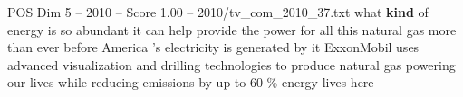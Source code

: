 \begin{textsample}{POS Dim 5 – 2010 – Score 1.00 – 2010/tv\_com\_2010\_37.txt}  \label{ex:f5_pos_078}
what \textbf{kind} of energy is so abundant it can help provide the power for all this natural gas more than ever before America 's electricity is generated by it ExxonMobil uses advanced visualization and drilling technologies to produce natural gas powering our lives while reducing emissions by up to 60 \% energy lives here

\end{textsample}
